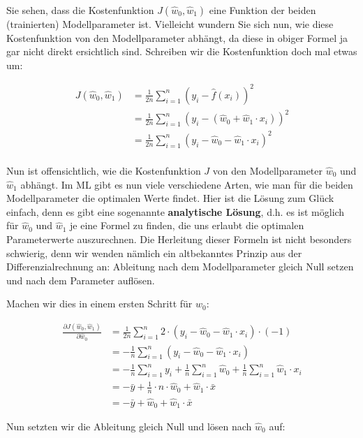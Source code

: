 \documentclass[
]{book}
\begin{document}
Sie sehen, dass die Kostenfunktion \(J(\hat{w}_0,\hat{w}_1)\) eine Funktion der beiden (trainierten) Modellparameter ist. Vielleicht wundern Sie sich nun, wie diese Kostenfunktion von den Modellparameter abhängt, da diese in obiger Formel ja gar nicht direkt ersichtlich sind. Schreiben wir die Kostenfunktion doch mal etwas um:

\begin{align}
J(\hat{w}_0, \hat{w}_1) &= \frac{1}{2n} \sum_{i=1}^{n} \left(y_i - \hat{f}(x_i) \right)^2 \\
&= \frac{1}{2n} \sum_{i=1}^{n} \left(y_i - (\hat{w}_0 + \hat{w}_1 \cdot x_i) \right)^2 \\
&= \frac{1}{2n} \sum_{i=1}^{n} \left(y_i - \hat{w}_0 - \hat{w}_1 \cdot x_i \right)^2 \\
\end{align}

Nun ist offensichtlich, wie die Kostenfunktion \(J\) von den Modellparameter \(\hat{w}_0\) und \(\hat{w}_1\) abhängt. Im ML gibt es nun viele verschiedene Arten, wie man für die beiden Modellparameter die optimalen Werte findet. Hier ist die Lösung zum Glück einfach, denn es gibt eine sogenannte \textbf{analytische Lösung}, d.h. es ist möglich für \(\hat{w}_0\) und \(\hat{w}_1\) je eine Formel zu finden, die uns erlaubt die optimalen Parameterwerte auszurechnen. Die Herleitung dieser Formeln ist nicht besonders schwierig, denn wir wenden nämlich ein altbekanntes Prinzip aus der Differenzialrechnung an: Ableitung nach dem Modellparameter gleich Null setzen und nach dem Parameter auflösen.

Machen wir dies in einem ersten Schritt für \(\hat{w}_0\):

\begin{align}
\frac{\partial J(\hat{w}_0, \hat{w}_1)}{\partial \hat{w}_0} &= \frac{1}{2n} \sum_{i=1}^{n} 2 \cdot \left(y_i - \hat{w}_0 - \hat{w}_1 \cdot x_i \right) \cdot (-1) \\
&= -\frac{1}{n} \sum_{i=1}^{n} \left(y_i - \hat{w}_0 - \hat{w}_1 \cdot x_i \right) \\
&= -\frac{1}{n} \sum_{i=1}^{n} y_i +  \frac{1}{n} \sum_{i=1}^{n} \hat{w}_0 + \frac{1}{n} \sum_{i=1}^{n} \hat{w}_1 \cdot x_i \\
&= -\bar{y} + \frac{1}{n} \cdot n \cdot \hat{w}_0 + \hat{w}_1 \cdot \bar{x} \\
&= -\bar{y} + \hat{w}_0 + \hat{w}_1 \cdot \bar{x}
\end{align}

Nun setzten wir die Ableitung gleich Null und lösen nach \(\hat{w}_0\) auf:
\end{document}
